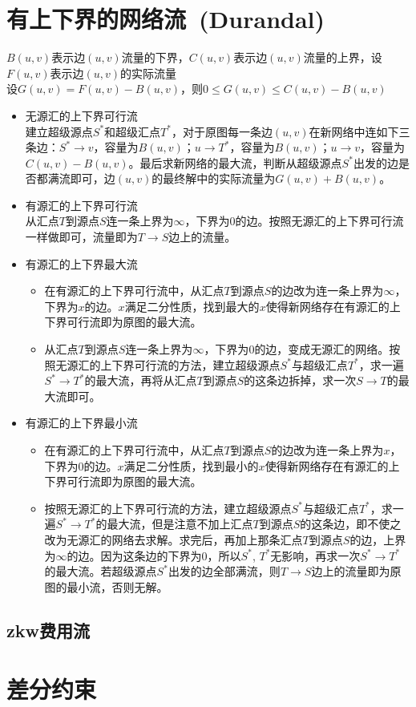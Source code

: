 \section{有上下界的网络流\ \small(Durandal)}
$ B(u, v) $表示边$ (u, v) $流量的下界，$ C(u, v) $表示边$ (u, v) $流量的上界，设$ F(u, v) $表示边$ (u, v) $的实际流量\\
设$ G(u, v) = F(u, v) - B(u, v) $，则$ 0 \leq G(u, v) \leq C(u, v) - B(u, v) $
\begin{itemize}
	\item 无源汇的上下界可行流\\
	建立超级源点$ S^\ast $和超级汇点$ T^\ast $，对于原图每一条边$ (u, v) $在新网络中连如下三条边：$ S^\ast \to v $，容量为$ B(u, v) $；$ u \to T^\ast $，容量为$ B(u, v) $；$ u \to v $，容量为$ C(u, v) - B(u, v) $。最后求新网络的最大流，判断从超级源点$ S^\ast $出发的边是否都满流即可，边$ (u, v) $的最终解中的实际流量为$ G(u, v) + B(u, v) $。
	\item 有源汇的上下界可行流\\
	从汇点$ T $到源点$ S $连一条上界为$ \infty $，下界为$ 0 $的边。按照无源汇的上下界可行流一样做即可，流量即为$ T \to S $边上的流量。
	\item 有源汇的上下界最大流
	\begin{itemize}
		\item 在有源汇的上下界可行流中，从汇点$ T $到源点$ S $的边改为连一条上界为$ \infty $，下界为$ x $的边。$ x $满足二分性质，找到最大的$ x $使得新网络存在有源汇的上下界可行流即为原图的最大流。
		\item 从汇点$ T $到源点$ S $连一条上界为$ \infty $，下界为$ 0 $的边，变成无源汇的网络。按照无源汇的上下界可行流的方法，建立超级源点$ S^\ast $与超级汇点$ T^\ast $，求一遍$ S^\ast \to T^\ast $的最大流，再将从汇点$ T $到源点$ S $的这条边拆掉，求一次$ S \to T $的最大流即可。
	\end{itemize}
	\item 有源汇的上下界最小流
	\begin{itemize}
		\item 在有源汇的上下界可行流中，从汇点$ T $到源点$ S $的边改为连一条上界为$ x $，下界为$ 0 $的边。$ x $满足二分性质，找到最小的$ x $使得新网络存在有源汇的上下界可行流即为原图的最大流。
		\item 按照无源汇的上下界可行流的方法，建立超级源点$ S^\ast $与超级汇点$ T^\ast $，求一遍$ S^\ast \to T^\ast $的最大流，但是注意不加上汇点$ T $到源点$ S $的这条边，即不使之改为无源汇的网络去求解。求完后，再加上那条汇点$ T $到源点$ S $的边，上界为$ \infty $的边。因为这条边的下界为$ 0 $，所以$ S^\ast $, $ T^\ast $无影响，再求一次$ S^\ast \to T^\ast $的最大流。若超级源点$ S^\ast $出发的边全部满流，则$ T \to S $边上的流量即为原图的最小流，否则无解。
	\end{itemize}
\end{itemize}
\subsection{zkw费用流}
\section{差分约束}